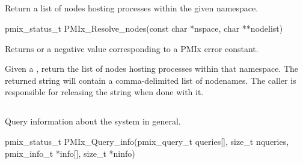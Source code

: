 \subsection{}

\summary

Return a list of nodes hosting processes within the given namespace.

\format

\cspecificstart
\begin{codepar}
pmix_status_t
PMIx_Resolve_nodes(const char *nspace, char **nodelist)
\end{codepar}
\cspecificend

\begin{arglist}
\end{arglist}

Returns  or a negative value corresponding to a PMIx error constant.

\descr

Given a , return the list of nodes hosting processes within that namespace.
The returned string will contain a comma-delimited list of nodenames.
The caller is responsible for releasing the string when done with it.


\subsection{}

\summary

Query information about the system in general.

\format

\cspecificstart
\begin{codepar}
pmix_status_t
PMIx_Query_info(pmix_query_t queries[], size_t nqueries,
                pmix_info_t *info[], size_t *ninfo)
\end{codepar}
\cspecificend

\begin{arglist}
\end{arglist}


